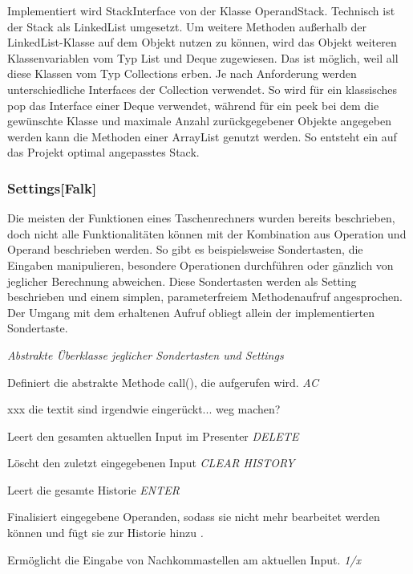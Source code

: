 Implementiert wird StackInterface von der Klasse OperandStack. Technisch ist der Stack als LinkedList umgesetzt. Um weitere Methoden außerhalb der LinkedList-Klasse auf dem Objekt nutzen zu können, wird das Objekt weiteren Klassenvariablen vom Typ List und Deque zugewiesen. Das ist möglich, weil all diese Klassen vom Typ Collections erben. Je nach Anforderung werden unterschiedliche Interfaces der Collection verwendet. So wird für ein klassisches pop das Interface einer Deque verwendet, während für ein peek bei dem die gewünschte Klasse und maximale Anzahl zurückgegebener Objekte angegeben werden kann die Methoden einer ArrayList genutzt werden. So entsteht ein auf das Projekt optimal angepasstes Stack.

\subsubsection{Settings[Falk]}

Die meisten der Funktionen eines Taschenrechners wurden bereits beschrieben, doch nicht alle Funktionalitäten können mit der Kombination aus Operation und Operand beschrieben werden. So gibt es beispielsweise Sondertasten, die Eingaben manipulieren, besondere Operationen durchführen oder gänzlich von jeglicher Berechnung abweichen. Diese Sondertasten werden als Setting beschrieben und einem simplen, parameterfreiem Methodenaufruf angesprochen. Der Umgang mit dem erhaltenen Aufruf obliegt allein der implementierten Sondertaste.


\textit{Abstrakte Überklasse jeglicher Sondertasten und Settings}

Definiert die abstrakte Methode call(), die aufgerufen wird.
\textit{AC }

xxx die textit sind irgendwie eingerückt... weg machen?

Leert den gesamten aktuellen Input im Presenter
\textit{DELETE} 

Löscht den zuletzt eingegebenen Input
\textit{CLEAR HISTORY}

Leert die gesamte Historie
\textit{ENTER}

Finalisiert eingegebene Operanden, sodass sie nicht mehr bearbeitet werden können und fügt sie zur Historie hinzu
\textit{.}

Ermöglicht die Eingabe von Nachkommastellen am aktuellen Input.
\textit{1/x}

